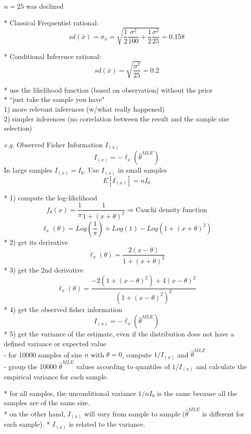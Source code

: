 \documentclass[10pt,landscape]{article}
\begin{document}
\begin{multicols}{3}
\begin{multicols}{2}
\pagebreak 
$n = 25$ was declined
\end{multicols}

* Classical Frequentist rational: \\
$$ sd(\bar{x}) = \sigma_{\bar{x}} = \sqrt{\frac{1}{2} \frac{\sigma^2}{100} + \frac{1}{2} \frac{\sigma^2}{25}} = 0.158 $$

* Conditional Inference rational: \\
$$ sd(\bar{x}) = \sqrt{\frac{\sigma^2}{25}} = 0.2 $$

* use the likelihood function (based on observation) without the prior \\
* ``just take the sample you have" \\

1) more relevant inferences (w/what really happened) \\
2) simpler inferences (no correlation between the result and the sample size selection)

\medskip
\emph{e.g.} Observed Fisher Information $I_{(x)}$
$$ I_{(x)} = -\ddot{\ell_x}(\hat{\theta}^{MLE}) $$
In large samples $I_{(x)} = I_0$. Use $I_{(x)}$ in small samples 
$$ E[I_{(x)}] = n I_0 $$ 

* 1) compute the log-likelihood \\
$$ f_{\theta}(x) = \frac{1}{\pi} \frac{1}{1 + (x + \theta)^2} \Rightarrow \text{Cauchi density function} $$
$$ \ell_x(\theta) = Log\left(\frac{1}{\pi}\right) + Log(1) - Log(1 + (x + \theta)^2) $$
* 2) get its derivative \\
$$ \dot{\ell}_x(\theta) = \frac{2(x - \theta)}{1 + (x + \theta)^2} $$
* 3) get the 2nd derivative \\
$$ \ddot{\ell}_x(\theta) = \frac{-2(1 + (x - \theta)^2) + 4(x - \theta)^2}{(1 + (x - \theta)^2)^2} $$
* 4) get the observed fisher information \\
$$ I_{(x)} = -\ddot{\ell_x}(\hat{\theta}^{MLE}) $$
* 5) get the variance of the estimate, even if the distribution does not have a defined variance or expected value \\
- for 10000 samples of size $n$ with $\theta = 0$, compute $1/I_{(x)}$ and $\hat{\theta}^{MLE}$ \\
- group the 10000 $\hat{\theta}^{MLE}$ values according to quantiles of $1/I_{(x)}$ and calculate the empirical variance for each sample.

\medskip
* for all samples, the unconditional variance $1/n I_0$ is the same because all the samples are of the same size. \\
* on the other hand, $I_{(x)}$ will vary from sample to sample ($\hat{\theta}^{MLE}$ is different for each sample).
* $I_{(x)}$ is related to the variance.


\end{multicols}
\end{document}
